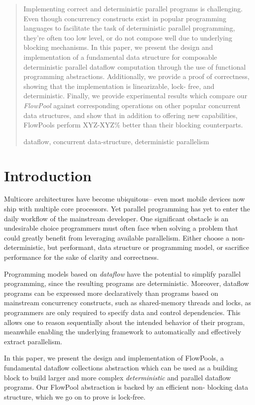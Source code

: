 \documentclass[runningheads,a4paper]{llncs}
\newcommand{\keywords}[1]{\par\addvspace\baselineskip
\noindent\keywordname\enspace\ignorespaces#1}
\begin{document}
\begin{abstract}
Implementing correct and deterministic parallel programs is challenging. Even
though concurrency constructs exist in popular programming languages to
facilitate the task of deterministic parallel programming, they're often too
low level, or do not compose well due to underlying blocking mechanisms. In
this paper, we present the design and implementation of a fundamental data
structure for composable deterministic parallel dataflow computation through
the use of functional programming abstractions. Additionally, we provide a
proof of correctness, showing that the implementation is linearizable, lock-
free, and deterministic. Finally, we provide experimental results which
compare our \emph{FlowPool} against corresponding operations on other popular
concurrent data structures, and show that in addition to offering new
capabilities, FlowPools perform XYZ-XYZ\% better than their blocking counterparts.
\keywords{dataflow, concurrent data-structure, deterministic parallelism}
\end{abstract}


\section{Introduction}

Multicore architectures have become ubiquitous-- even most mobile devices now
ship with multiple core processors. Yet parallel programming has yet to enter
the daily workflow of the mainstream developer. One significant obstacle is an
undesirable choice programmers must often face when solving a problem that
could greatly benefit from leveraging available parallelism. Either choose a
non-deterministic, but performant, data structure or programming model, or
sacrifice performance for the sake of clarity and correctness.

Programming models based on \emph{dataflow} \cite{Arvind89,CnC10} have the
potential to simplify parallel programming, since the resulting programs are
deterministic. Moreover, dataflow programs can be expressed more declaratively
than programs based on mainstream concurrency constructs, such as shared-memory 
threads and locks, as programmers are only required to specify data and
control dependencies. This allows one to reason sequentially about the
intended behavior of their program, meanwhile enabling the underlying
framework to automatically and effectively extract parallelism.

In this paper, we present the design and implementation of FlowPools, a
fundamental dataflow collections abstraction which can be used as a building
block to build larger and more complex \textit{deterministic} and parallel
dataflow programs. Our FlowPool abstraction is backed by an efficient non-
blocking data structure, which we go on to prove is lock-free.
\end{document}
